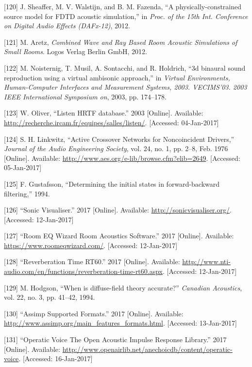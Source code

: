 \documentclass[]{scrreprt}
\begin{document}
\hypertarget{ref-sheafferux5fphysically-constrainedux5f2012}{}
{[}120{]} J. Sheaffer, M. V. Walstijn, and B. M. Fazenda, ``A
physically-constrained source model for FDTD acoustic simulation,'' in
\emph{Proc. of the 15th Int. Conference on Digital Audio Effects
(DAFx-12)}, 2012.

\hypertarget{ref-aretzux5fcombinedux5f2012}{}
{[}121{]} M. Aretz, \emph{Combined Wave and Ray Based Room Acoustic
Simulations of Small Rooms}. Logos Verlag Berlin GmbH, 2012.

\hypertarget{ref-noisternigux5f3dux5f2003}{}
{[}122{]} M. Noisternig, T. Musil, A. Sontacchi, and R. Holdrich, ``3d
binaural sound reproduction using a virtual ambisonic approach,'' in
\emph{Virtual Environments, Human-Computer Interfaces and Measurement
Systems, 2003. VECIMS'03. 2003 IEEE International Symposium on}, 2003,
pp. 174--178.

\hypertarget{ref-oliverux5flistenux5f2003}{}
{[}123{]} W. Oliver, ``Listen HRTF database.'' 2003 {[}Online{]}.
Available: \url{http://recherche.ircam.fr/equipes/salles/listen/}.
{[}Accessed: 04-Jan-2017{]}

\hypertarget{ref-linkwitzux5factiveux5f1976}{}
{[}124{]} S. H. Linkwitz, ``Active Crossover Networks for Noncoincident
Drivers,'' \emph{Journal of the Audio Engineering Society}, vol. 24, no.
1, pp. 2--8, Feb. 1976 {[}Online{]}. Available:
\url{http://www.aes.org/e-lib/browse.cfm?elib=2649}. {[}Accessed:
05-Jan-2017{]}

\hypertarget{ref-gustafssonux5fdeterminingux5f1994}{}
{[}125{]} F. Gustafsson, ``Determining the initial states in
forward-backward filtering,'' 1994.

\hypertarget{ref-ux5fsonicux5f2017}{}
{[}126{]} ``Sonic Visualiser.'' 2017 {[}Online{]}. Available:
\url{http://sonicvisualiser.org/}. {[}Accessed: 12-Jan-2017{]}

\hypertarget{ref-ux5froomux5f2017}{}
{[}127{]} ``Room EQ Wizard Room Acoustics Software.'' 2017 {[}Online{]}.
Available: \url{https://www.roomeqwizard.com/}. {[}Accessed:
12-Jan-2017{]}

\hypertarget{ref-ux5freverberationux5f2017}{}
{[}128{]} ``Reverberation Time RT60.'' 2017 {[}Online{]}. Available:
\url{http://www.nti-audio.com/en/functions/reverberation-time-rt60.aspx}.
{[}Accessed: 12-Jan-2017{]}

\hypertarget{ref-hodgsonux5fwhenux5f1994}{}
{[}129{]} M. Hodgson, ``When is diffuse-field theory accurate?''
\emph{Canadian Acoustics}, vol. 22, no. 3, pp. 41--42, 1994.

\hypertarget{ref-ux5fassimpux5f2017}{}
{[}130{]} ``Assimp Supported Formats.'' 2017 {[}Online{]}. Available:
\url{http://www.assimp.org/main_features_formats.html}. {[}Accessed:
13-Jan-2017{]}

\hypertarget{ref-ux5foperaticux5f2017}{}
{[}131{]} ``Operatic Voice The Open Acoustic Impulse Response Library.''
2017 {[}Online{]}. Available:
\url{http://www.openairlib.net/anechoicdb/content/operatic-voice}.
{[}Accessed: 16-Jan-2017{]}
\end{document}
